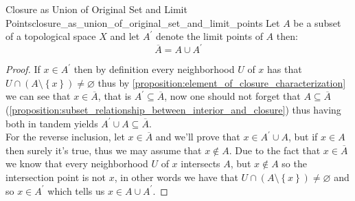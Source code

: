 \begin{proposition}{Closure as Union of Original Set and Limit
Points}{closure_as_union_of_original_set_and_limit_points}
Let \( A \) be a subset of a topological space \( X \) and let \( A ^{ \prime  }
\) denote the limit points of \( A \) then: 
\[
\overline{A} = A \cup  A ^{ \prime  } 
\]
\end{proposition}
\begin{proof}
    If \( x \in  A ^{ \prime  } \) then by definition every neighborhood \( U \)
    of \( x \) has that \( U  \cap \left( A \setminus \left\{ x \right\}
    \right) \neq \varnothing \) thus by
    \ref{proposition:element_of_closure_characterization} we can see that \( x
    \in  \overline{A}  \), that is \( A ^{ \prime  } \subseteq \overline{A}  \),
    now one should not forget that \( A \subseteq \overline{A}  \)
    (\ref{proposition:subset_relationship_between_interior_and_closure}) thus
    having both in tandem yields \( A ^{ \prime  }  \cup  A \subseteq
    \overline{A} \).\\
    For the reverse inclusion, let \( x \in  \overline{A}  \) and we'll prove
    that \( x \in  A ^{ \prime  } \cup  A \), but if \( x \in A \) then surely
    it's true, thus we may assume that \( x \not\in A \). Due to the fact that
    \( x \in \overline{A}  \) we know that every neighborhood \( U \) of \( x \)
    intersects \( A \), but \( x \not\in A \) so the intersection point is not
    \( x \), in other words we have that \( U \cap  \left( A \setminus \left\{ x
    \right\}  \right) \neq \varnothing  \) and so \( x \in A ^{ \prime  }  \)
    which tells us \( x \in A \cup A ^{ \prime  }  \).
\end{proof}
